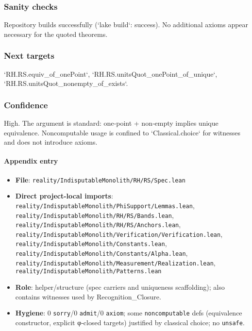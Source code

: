 \documentclass{article}
\newcommand{\FileRef}[1]{\texttt{#1}}
\begin{document}
\subsubsection{Sanity checks}
Repository builds successfully (`lake build`: success). No additional axioms appear necessary for the quoted theorems.

\subsubsection{Next targets}
`RH.RS.equiv_of_onePoint`, `RH.RS.unitsQuot_onePoint_of_unique`, `RH.RS.unitsQuot_nonempty_of_exists`.

\subsubsection{Confidence}
High. The argument is standard: one‑point + non‑empty implies unique equivalence. Noncomputable usage is confined to `Classical.choice` for witnesses and does not introduce axioms.

\paragraph{Appendix entry}
\begin{itemize}[leftmargin=*]
  \item \textbf{File}: \FileRef{reality/IndisputableMonolith/RH/RS/Spec.lean}
  \item \textbf{Direct project-local imports}: \FileRef{reality/IndisputableMonolith/PhiSupport/Lemmas.lean}, \FileRef{reality/IndisputableMonolith/RH/RS/Bands.lean}, \FileRef{reality/IndisputableMonolith/RH/RS/Anchors.lean}, \FileRef{reality/IndisputableMonolith/Verification/Verification.lean}, \FileRef{reality/IndisputableMonolith/Constants.lean}, \FileRef{reality/IndisputableMonolith/Constants/Alpha.lean}, \FileRef{reality/IndisputableMonolith/Measurement/Realization.lean}, \FileRef{reality/IndisputableMonolith/Patterns.lean}
  \item \textbf{Role}: helper/structure (spec carriers and uniqueness scaffolding); also contains witnesses used by Recognition\_Closure.
  \item \textbf{Hygiene}: 0 \texttt{sorry}/0 \texttt{admit}/0 \texttt{axiom}; some \texttt{noncomputable} defs (equivalence constructor, explicit φ‑closed targets) justified by classical choice; no \texttt{unsafe}.
\end{itemize}
\end{document}
